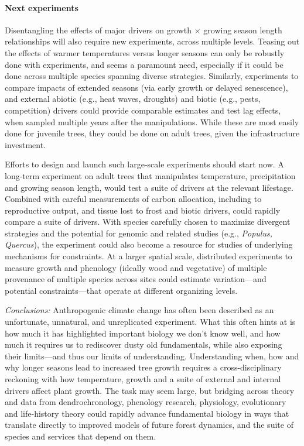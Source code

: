 \documentclass[11pt]{article}
\begin{document}
\paragraph{Next experiments}

Disentangling the effects of major drivers on growth $\times$ growing season length relationships will also require new experiments, across multiple levels. Teasing out the effects of warmer temperatures versus longer seasons can only be robustly done with experiments, and seems a paramount need, especially if it could be done across multiple species spanning diverse strategies. Similarly, experiments to compare impacts of extended seasons (via early growth or delayed senescence), and external abiotic (e.g., heat waves, droughts) and biotic (e.g., pests, competition) drivers could provide comparable estimates and test lag effects, when sampled multiple years after the manipulations. While these are most easily done for juvenile trees, they could be done on adult trees, given the infrastructure investment. %

Efforts to design and launch such large-scale experiments should start now. A long-term experiment on adult trees that manipulates temperature, precipitation and growing season length, would test a suite of drivers at the relevant lifestage. Combined with careful measurements of carbon allocation, including to reproductive output, and tissue lost to frost and biotic drivers, could rapidly compare a suite of drivers. With species carefully chosen to maximize divergent strategies and the potential for genomic and related studies (e.g., \emph{Populus, Quercus}), the experiment could also become a resource for studies of underlying mechanisms for constraints. At a larger spatial scale, distributed experiments to measure growth and phenology (ideally wood and vegetative) of multiple provenance of multiple species across sites could estimate variation---and potential constraints---that operate at different organizing levels. 

\emph{Conclusions:}
Anthropogenic climate change has often been described as an unfortunate, unnatural, and unreplicated experiment. What this often hints at is how much it has highlighted important biology we don't know well, and how much it requires us to rediscover dusty old fundamentals, while also exposing their limits---and thus our limits of understanding. Understanding when, how and why longer seasons lead to increased tree growth requires a cross-disciplinary reckoning with how temperature, growth and a suite of external and internal drivers affect plant growth. The task may seem large, but bridging across theory and data from dendrochronology, phenology research, physiology, evolutionary and life-history theory could rapidly advance fundamental biology in ways that translate directly to improved models of future forest dynamics, and the suite of species and services that depend on them. %
\end{document}
